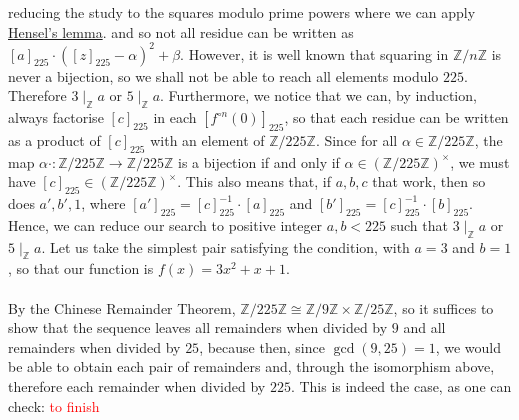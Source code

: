 \begin{solution}
{    reducing the study to the squares modulo prime powers where we can apply \href{https://en.wikipedia.org/wiki/Hensel\%27s_lemma}{Hensel's lemma}.} and so not all residue can be written as \( \left[a\right]_{225} \cdot \left( \left[z\right]_{225} - \alpha \right)^{2} + \beta \). However, it is well known that squaring in \( \mathbb{Z} / n \mathbb{Z} \) is never a bijection, so we shall not be able to reach all elements modulo \( 225 \). Therefore \( 3 \mid_{\mathbb{Z}} a \) or \( 5 \mid_{\mathbb{Z}} a \). Furthermore, we notice that we can, by induction, always factorise \( \left[c\right]_{225} \) in each \( \left[f^{\circ n}\left(0\right)\right]_{225} \), so that each residue can be written as a product of \( \left[c\right]_{225} \) with an element of \( \mathbb{Z}/225\mathbb{Z} \). Since for all \( \alpha \in \mathbb{Z} / 225 \mathbb{Z} \), the map \( \alpha \cdot : \mathbb{Z} / 225 \mathbb{Z} \rightarrow \mathbb{Z} / 225 \mathbb{Z} \) is a bijection if and only if \( \alpha \in \left( \mathbb{Z} / 225 \mathbb{Z} \right)^{\times} \), we must have \( \left[c\right]_{225}\in\left(\mathbb{Z}/225\mathbb{Z}\right)^{\times} \). This also means that, if \( a, b, c \) that work, then so does \( a', b', 1 \), where \( \left[a'\right]_{225} = \left[c\right]_{225}^{-1} \cdot \left[a\right]_{225} \) and \( \left[b'\right]_{225} = \left[c\right]_{225}^{-1} \cdot \left[b\right]_{225} \). Hence, we can reduce our search to positive integer \( a, b<225 \) such that \( 3 \mid_{\mathbb{Z}} a \) or \( 5 \mid_{\mathbb{Z}} a \). Let us take the simplest pair satisfying the condition, with \( a = 3 \) and \( b = 1 \), so that our function is \( f\left(x\right) = 3x^{2} + x + 1 \).
    \\\\
    By the Chinese Remainder Theorem, \( \mathbb{Z} / 225 \mathbb{Z} \cong \mathbb{Z} / 9 \mathbb{Z} \times \mathbb{Z} / 25 \mathbb{Z} \), so it suffices to show that the sequence leaves all remainders when divided by \( 9 \) and all remainders when divided by \( 25 \), because then, since \( \gcd\left(9, 25\right) = 1 \), we would be able to obtain each pair of remainders and, through the isomorphism above, therefore each remainder when divided by \( 225 \). This is indeed the case, as one can check: \textcolor{red}{to finish}
\end{solution}
